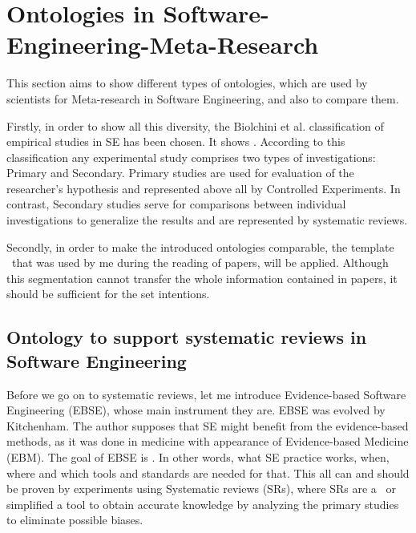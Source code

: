 		

\section{Ontologies in Software-Engineering-Meta-Research}
\label{sec:OntinSEMR:start}  
This section aims to show different types of ontologies, which are used by scientists for Meta-research in Software Engineering, and also to compare them.

Firstly, in order to show all this diversity, the Biolchini et al. \cite{Bio07} classification of empirical studies in SE has been chosen. It shows \frqq\cite{Gar08}. According to this classification any experimental study comprises two types of investigations: Primary and Secondary\cite{Bio07}. Primary studies are used for evaluation of the researcher's hypothesis and represented above all by Controlled Experiments. In contrast, Secondary studies serve for comparisons between individual investigations to generalize the results and are represented by systematic reviews.

Secondly, in order to make the introduced ontologies comparable, the template  \frqq \ that was used by me during the reading of papers, will be applied. Although this segmentation cannot transfer the whole information contained in papers, it should be sufficient for the set intentions.
    
 
	\subsection{Ontology to support systematic reviews in Software Engineering}  
	Before we go on to systematic reviews, let me introduce Evidence-based Software Engineering (EBSE), whose main instrument they are. EBSE was evolved by Kitchenham\cite{Kit04}. The author supposes that SE might benefit from the evidence-based methods, as it was done in medicine with appearance of Evidence-based Medicine (EBM). The goal of EBSE is \frqq \cite{Kit04}. In other words, what SE practice works,  when, where and which tools and standards are needed for that. This all can and should be proven by experiments using Systematic reviews (SRs), where SRs are a \frqq \cite{Kit07} \ or simplified a tool to obtain accurate knowledge by analyzing the primary studies to eliminate possible biases.
	
